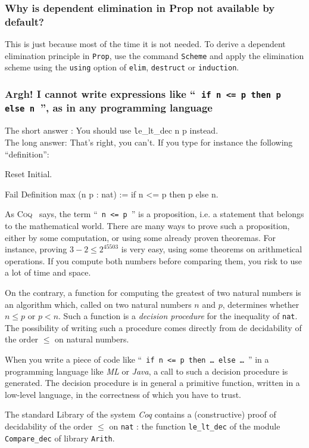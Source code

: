 \documentclass[a4paper,pdftex]{article}
\def\Question#1{\stepcounter{question}\subsubsection{#1}}
\def\Coq{\textsc{Coq}}
\begin{document}
\Question{Why is dependent elimination in Prop not
available by default?}

 
This is just because most of the time it is not needed. To derive a
dependent elimination principle in {\tt Prop}, use the command {\tt Scheme} and
apply the elimination scheme using the \verb=using= option of
\verb=elim=, \verb=destruct= or \verb=induction=.


\Question{Argh! I cannot write expressions like ``~{\tt if n <= p then p else n}~'', as in any programming language}
\label{minmax}

The short answer : You should use {\texttt le\_lt\_dec n p} instead.\\

The long answer: That's right, you can't.
If you type for instance the following ``definition'':
\begin{coq_eval}
Reset Initial.
\end{coq_eval}
\begin{coq_example}
Fail Definition max (n p : nat) := if n <= p then p else n.
\end{coq_example}

As \Coq~ says, the term ``~\texttt{n <= p}~'' is a proposition, i.e. a
statement that belongs to the mathematical world. There are many ways to
prove such a proposition, either by some computation, or using some already
proven theoremas. For instance, proving $3-2 \leq 2^{45503}$ is very easy,
using some theorems on arithmetical operations. If you compute both numbers
before comparing them, you risk to use a lot of time and space.


On the contrary, a function for computing the greatest of two natural numbers
is an algorithm  which, called on two natural numbers
$n$ and $p$, determines whether $n\leq p$ or $p < n$.
Such a function is a \emph{decision  procedure} for the inequality of
 \texttt{nat}.  The possibility of writing such a procedure comes 
directly from de decidability of the order $\leq$ on natural numbers.


When you write a piece of code like 
``~\texttt{if n <= p then \dots{} else \dots}~''
in a
programming language like \emph{ML} or \emph{Java}, a call to such a 
decision procedure is generated. The decision procedure is in general
a primitive function, written in a low-level language, in the correctness
of which you have to trust.

The standard Library of the system \emph{Coq} contains a  
(constructive) proof of decidability of the order $\leq$ on
\texttt{nat} : the function \texttt{le\_lt\_dec} of 
the module \texttt{Compare\_dec} of library \texttt{Arith}.
\end{document}
